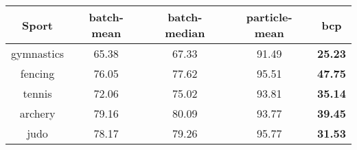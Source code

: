 \begin{tabular}{|c|c|c|c|c|}
\hline
Sport & batch-mean & batch-median & particle-mean & bcp \\
\hline
gymnastics & 65.38 & 67.33 & 91.49 & \textbf{25.23} \\
fencing & 76.05 & 77.62 & 95.51 & \textbf{47.75} \\
tennis & 72.06 & 75.02 & 93.81 & \textbf{35.14} \\
archery & 79.16 & 80.09 & 93.77 & \textbf{39.45} \\
judo & 78.17 & 79.26 & 95.77 & \textbf{31.53} \\
\hline
\end{tabular}
